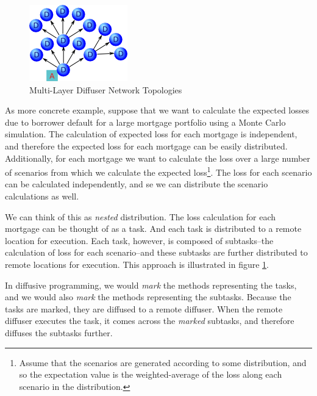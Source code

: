 \documentclass[11pt]{scrartcl}
\begin{document}
\begin{figure}[htbp]
\begin{center}
\includegraphics[scale=1.0]{topology_multi_layer}
\caption{Multi-Layer Diffuser Network Topologies\label{fig:topology_multi_layer}}
\end{center}
\end{figure}

As more concrete example, suppose that we want to calculate the expected losses due to borrower default for a large mortgage portfolio using a Monte Carlo simulation. The calculation of expected loss for each mortgage is independent, and therefore the expected loss for each mortgage can be easily distributed. Additionally, for each mortgage we want to calculate the loss over a large number of scenarios from which we calculate the expected loss\footnote{Assume that the scenarios are generated according to some distribution, and so the expectation value is the weighted-average of the loss along each scenario in the distribution.}. The loss for each scenario can be calculated independently, and se we can distribute the scenario calculations as well. 

We can think of this as \emph{nested} distribution. The loss calculation for each mortgage can be thought of as a task. And each task is distributed to a remote location for execution. Each task, however, is composed of subtasks--the calculation of loss for each scenario--and these subtasks are further distributed to remote locations for execution. This approach is illustrated in figure \ref{fig:topology_multi_layer}.

In diffusive programming, we would \emph{mark} the methods representing the tasks, and we would also \emph{mark} the methods representing the subtasks. Because the tasks are marked, they are diffused to a remote diffuser. When the remote diffuser executes the task, it comes across the \emph{marked} subtasks, and therefore diffuses the subtasks further.

\end{document}
